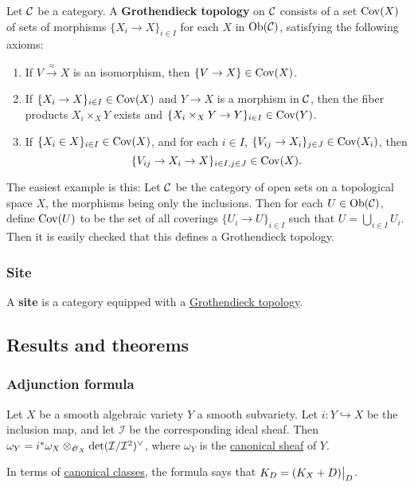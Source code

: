 \documentclass[11pt, english]{article}
\begin{document}
Let $\mathcal{C}$ be a category. A \textbf{Grothendieck topology} on $\mathcal{C}$ consists of a set $\operatorname{Cov}(X)$ of sets of morphisms $\{ X_i \to X\}_{i \in I}$ for each $X$ in $\mathrm{Ob}(\mathcal{C})$, satisfying the following axioms:
\begin{enumerate}
\item If $V \xrightarrow{\approx} X$ is an isomorphism, then $\{ V \to X\} \in \operatorname{Cov}(X)$.
\item If $\{X_i \to X\}_{i \in I} \in \operatorname{Cov}(X)$ and $Y \to X$ is a morphism in $\mathcal{C}$, then the fiber products $X_i \times_X Y$ exists and ${\{ X_i \times_X Y \to Y\}_{i \in I} \in \operatorname{Cov}(Y)}$.
\item If $\{X_i \in X\}_{i \in I} \in \operatorname{Cov}(X)$, and for each $i \in I$, $\{ V_{ij} \to X_i\}_{j \in J} \in  \operatorname{Cov}(X_i)$, then
\[
\{ V_{ij} \to X_i \to X\}_{i \in I, j \in J} \in \operatorname{Cov}(X).
\]
\end{enumerate}

The easiest example is this: Let $\mathcal{C}$ be the category of open sets on a topological space $X$, the morphisms being only the inclusions. Then for each $U \in \mathrm{Ob}(\mathcal{C})$, define $\operatorname{Cov}(U)$ to be the set of all coverings $\{ U_i \to U \}_{i \in I}$ such that $U = \bigcup_{i\in I} U_i$. Then it is easily checked that this defines a Grothendieck topology.

\subsubsection{Site}
\label{site}

A \textbf{site} is a category equipped with a \hyperref[grothendiecktopology]{Grothendieck topology}.


\subsection{Results and theorems}
\subsubsection{Adjunction formula}
\label{adjunction}

Let $X$ be a smooth algebraic variety $Y$ a smooth subvariety. Let $i:Y \hookrightarrow X$ be the inclusion map, and let $\mathcal I$ be the corresponding ideal sheaf. Then $\omega_Y = i^\ast \omega_X \otimes_{\operatorname{\mathscr{O}}_X} \det(\mathcal I/\mathcal I^2)^\vee$, where $\omega_Y$ is the \hyperref[canonicalsheaf]{canonical sheaf} of $Y$.

In terms of \hyperref[canonicaldivisor]{canonical classes}, the formula says that $K_D = \restr{(K_X + D)}{D}$. 
\end{document}
